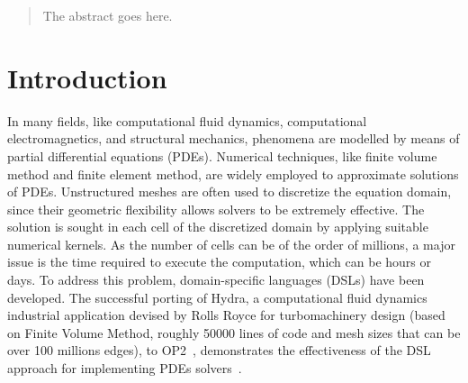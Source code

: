 \documentclass[conference]{IEEEtran}
\begin{document}
\maketitle


\begin{abstract}
The abstract goes here.
\end{abstract}





%
\IEEEpeerreviewmaketitle



\section{Introduction}
In many fields, like computational fluid dynamics, computational electromagnetics, and structural mechanics, phenomena are modelled by means of partial differential equations (PDEs). Numerical techniques, like finite volume method and finite element method, are widely employed to approximate solutions of PDEs. Unstructured meshes are often used to discretize the equation domain, since their geometric flexibility allows solvers to be extremely effective. The solution is sought in each cell of the discretized domain by applying suitable numerical kernels. As the number of cells can be of the order of millions, a major issue is the time required to execute the computation, which can be hours or days. To address this problem, domain-specific languages (DSLs) have been developed. The successful porting of Hydra, a computational fluid dynamics industrial application devised by Rolls Royce for turbomachinery design (based on Finite Volume Method, roughly 50000 lines of code and mesh sizes that can be over 100 millions edges), to OP2~\cite{pyop2ics}, demonstrates the effectiveness of the DSL approach for implementing PDEs solvers~\cite{OP2-hydra}. 
\end{document}
